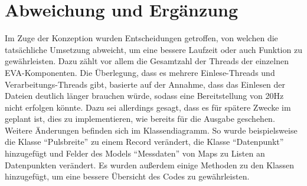 \chapter{Abweichung und Ergänzung}\label{ch:abweichung-und-ergaenzung}

Im Zuge der Konzeption wurden Entscheidungen getroffen, von welchen die tatsächliche Umsetzung abweicht, um eine bessere Laufzeit oder auch Funktion zu gewährleisten.
Dazu zählt vor allem die Gesamtzahl der Threads der einzelnen EVA-Komponenten.
Die Überlegung, dass es mehrere Einlese-Threads und Verarbeitungs-Threads gibt, basierte auf der Annahme, dass das Einlesen der Dateien deutlich länger brauchen würde, sodass eine Bereitstellung von 20Hz nicht erfolgen könnte.
Dazu sei allerdings gesagt, dass es für spätere Zwecke im~ geplant ist, dies zu implementieren, wie bereits für die Ausgabe geschehen.\\
Weitere Änderungen befinden sich im Klassendiagramm.
So wurde beispielsweise die Klasse \enquote{Pulsbreite} zu einem Record verändert, die Klasse \enquote{Datenpunkt} hinzugefügt und Felder des Models \enquote{Messdaten} von Maps zu Listen an Datenpunkten verändert.
Es wurden außerdem einige Methoden zu den Klassen hinzugefügt, um eine bessere Übersicht des Codes zu gewährleisten.

